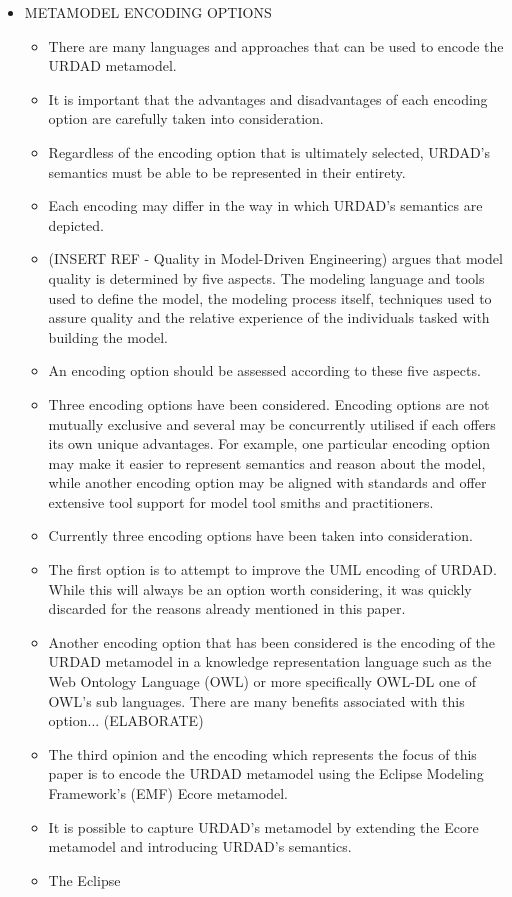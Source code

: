 \begin{itemize}
	
	\item METAMODEL ENCODING OPTIONS
		\begin{itemize}
				\item There are many languages and approaches that can be used to encode the URDAD metamodel. 
				\item It is important that the advantages and disadvantages of each encoding option are carefully taken into consideration.
				\item Regardless of the encoding option that is ultimately selected, URDAD's semantics must be able to be represented in their entirety.
				\item Each encoding may differ in the way in which URDAD's semantics are depicted.				
				\item (INSERT REF - Quality in Model-Driven Engineering) argues that model quality is determined by five aspects. The modeling language and tools used to define the model, the modeling process itself, techniques used to assure quality and the relative experience of the individuals tasked with building the model.
				\item An encoding option should be assessed according to these five aspects.
				\item Three encoding options have been considered. Encoding options are not mutually exclusive and several may be concurrently utilised if each offers its own unique advantages. For example, one particular encoding option may make it easier to represent semantics and reason about the model, while another encoding option may be aligned with standards and offer extensive tool support for model tool smiths and practitioners. 
				\item Currently three encoding options have been taken into consideration.
				\item The first option is to attempt to improve the UML encoding of URDAD. While this will always be an option worth considering, it was quickly discarded for the reasons already mentioned in this paper.
				\item Another encoding option that has been considered is the encoding of the URDAD metamodel in a knowledge representation language such as the Web Ontology Language (OWL) or more specifically OWL-DL one of OWL's sub languages. There are many benefits associated with this option... (ELABORATE)
				\item The third opinion and the encoding which represents the focus of this paper is to encode the URDAD metamodel using the Eclipse Modeling Framework's (EMF) Ecore metamodel. 
				\item It is possible to capture URDAD's metamodel by extending the Ecore metamodel and introducing URDAD's semantics.
				\item The Eclipse 
				

\end{itemize}
\end{itemize}
